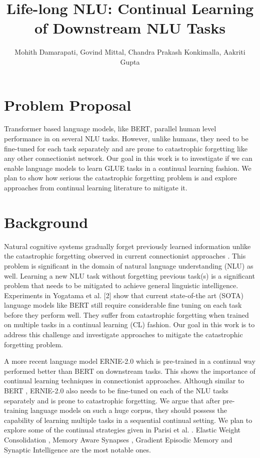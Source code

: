 \documentclass[11pt,a4paper]{article}
\title{Life-long NLU: Continual Learning of Downstream NLU Tasks}
\author{Mohith Damarapati, Govind Mittal, Chandra Prakash Konkimalla, Aakriti Gupta}
\date{}
\begin{document}
\maketitle

\vspace{-2cm}

\section{Problem Proposal}

Transformer based language models, like BERT, parallel human level performance in on several NLU tasks.  However, unlike humans, they need to be fine-tuned for each task separately and are prone to catastrophic forgetting like any other connectionist network. Our goal in this work is to investigate if we can enable language models to learn GLUE tasks in a continual learning fashion. We plan to show how serious the catastrophic forgetting problem is and explore approaches from continual learning literature to mitigate it.  


\section{Background}

Natural cognitive systems gradually forget previously learned information unlike the catastrophic forgetting observed in current connectionist approaches \cite{french1999catastrophic}. This problem is significant in the domain of natural language understanding (NLU) as well.  Learning a new NLU task without forgetting previous task(s) is a significant problem that needs to be mitigated to achieve general linguistic intelligence. Experiments in Yogatama et al. [2] show that current state-of-the art (SOTA) language models like BERT \cite{DBLP:journals/corr/abs-1810-04805} still require considerable fine tuning on each task before they perform well. They suffer from catastrophic forgetting when trained on multiple tasks in a continual learning (CL) fashion.   Our goal in this work is to address this challenge and investigate approaches to mitigate the catastrophic forgetting problem. 

A more recent language model ERNIE-2.0 \cite{DBLP:journals/corr/abs-1907-12412} which is pre-trained in a continual way performed better than BERT \cite{DBLP:journals/corr/abs-1810-04805} on downstream tasks.  This shows the importance of continual learning techniques in connectionist approaches.  Although similar to BERT 
\cite{DBLP:journals/corr/abs-1810-04805}, ERNIE-2.0 \cite{DBLP:journals/corr/abs-1907-12412} also needs to be fine-tuned on each of the NLU tasks separately and is prone to catastrophic forgetting.  We argue that after pre-training language models on such a huge corpus, they should possess the capability of learning multiple tasks in a sequential continual setting.  We plan to explore some of the continual strategies given in Parisi et al. \cite{DBLP:journals/corr/abs-1802-07569}.   Elastic Weight Consolidation \cite{DBLP:journals/corr/KirkpatrickPRVD16}, Memory Aware Synapses \cite{aljundi2018memory}, Gradient Episodic Memory \cite{DBLP:journals/corr/Lopez-PazR17} and Synaptic Intelligence \cite{DBLP:journals/corr/ZenkePG17} are the most notable ones.  
\end{document}
